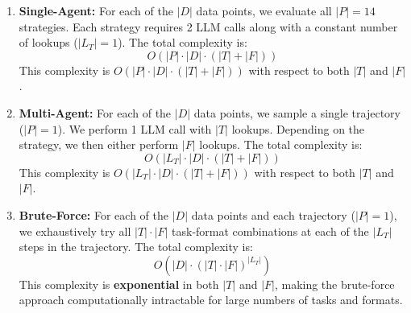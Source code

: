 \begin{enumerate}

    \item \textbf{Single-Agent:} For each of the $|D|$ data points, we evaluate all $|P| = 14$ strategies. Each strategy requires 2 LLM calls along with a constant number of lookups ($|L_T| = 1$). The total complexity is:
    \begin{equation}
        O(|P| \cdot |D| \cdot (|T| + |F|))
    \end{equation}
    This complexity is $O(|P| \cdot |D| \cdot (|T| + |F|))$ with respect to both $|T|$ and $|F|$.
    

    \item \textbf{Multi-Agent:} For each of the $|D|$ data points, we sample a single trajectory ($|P| = 1$). We perform 1 LLM call with $|T|$ lookups. Depending on the strategy, we then either perform $|F|$ lookups. The total complexity is:
    \begin{equation}
        O(|L_T| \cdot |D| \cdot (|T| + |F|) )
    \end{equation}
    This complexity is $O(|L_T| \cdot |D| \cdot (|T| + |F|) )$ with respect to both $|T|$ and $|F|$.
    
    \item \textbf{Brute-Force:} For each of the $|D|$ data points and each trajectory ($|P| = 1$), we exhaustively try all $|T| \cdot |F|$ task-format combinations at each of the $|L_T|$ steps in the trajectory. The total complexity is:
    \begin{equation}
        O\left(|D| \cdot (|T| \cdot |F|)^{|L_T|}\right)
    \end{equation}
    This complexity is \textbf{exponential} in both $|T|$ and $|F|$, making the brute-force approach computationally intractable for large numbers of tasks and formats.
\end{enumerate}

